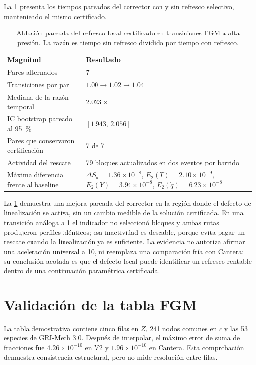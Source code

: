 \documentclass[12pt,a4paper,twoside,openany]{book}
\newcommand{\Su}{S_{\mathrm{u}}}
\begin{document}
La \cref{tab:local-refresh-ablation} presenta los tiempos pareados del
corrector con y sin refresco selectivo, manteniendo el mismo certificado.

\begin{table}[htbp]
\centering
\caption{Ablación pareada del refresco local certificado en transiciones FGM a
alta presión. La razón es tiempo sin refresco dividido por tiempo con refresco.}
\label{tab:local-refresh-ablation}
\begin{tabular}{@{}p{}p{}@{}}
\toprule
\textbf{Magnitud} & \textbf{Resultado} \\
\midrule
Pares alternados & 7 \\
Transiciones por par & \(1.00\rightarrow1.02\rightarrow1.04\) \\
Mediana de la razón temporal & \(2.023\times\) \\
IC bootstrap pareado al \SI{95}{\percent} & \([1.943,\,2.056]\) \\
Pares que conservaron certificación & 7 de 7 \\
Actividad del rescate & 79 bloques actualizados en dos eventos por barrido \\
Máxima diferencia frente al baseline &
\(\Delta\Su=1.36\times10^{-8}\),
\(E_2(T)=2.10\times10^{-9}\),
\(E_2(Y)=3.94\times10^{-8}\),
\(E_2(\dot q)=6.23\times10^{-8}\) \\
\bottomrule
\end{tabular}
\end{table}

La \cref{tab:local-refresh-ablation} demuestra una mejora pareada del
corrector en la región donde el defecto de linealización se activa, sin un
cambio medible de la solución certificada. En una transición análoga a
\SI{1}{\atmosphere} el indicador no seleccionó bloques y ambas rutas produjeron
perfiles idénticos; esa inactividad es deseable, porque evita pagar un rescate
cuando la linealización ya es suficiente. La evidencia no autoriza afirmar una
aceleración universal a \SI{10}{\atmosphere}, ni reemplaza una comparación fría
con Cantera: su conclusión acotada es que el defecto local puede identificar un
refresco rentable dentro de una continuación paramétrica certificada.

\section{Validación de la tabla FGM}

La tabla demostrativa contiene cinco filas en \(Z\), 241 nodos comunes en \(c\)
y las 53 especies de GRI-Mech 3.0. Después de interpolar, el máximo error de
suma de fracciones fue \(4.26\times10^{-10}\) en V2 y
\(1.96\times10^{-10}\) en Cantera. Esta comprobación demuestra consistencia
estructural, pero no mide resolución entre filas.
\end{document}
